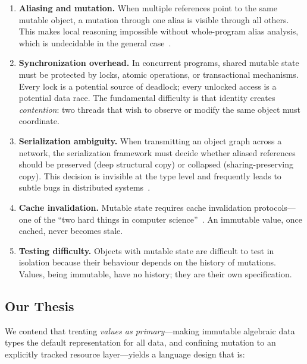 \documentclass[11pt]{article}
\theoremstyle{definition}
\theoremstyle{remark}
\begin{document}
\begin{enumerate}
  \item \textbf{Aliasing and mutation.}  When multiple references
    point to the same mutable object, a mutation through one alias is
    visible through all others.  This makes local reasoning
    impossible without whole-program alias analysis, which is
    undecidable in the general case~\cite{landi1992undecidability}.

  \item \textbf{Synchronization overhead.}  In concurrent programs,
    shared mutable state must be protected by locks, atomic
    operations, or transactional mechanisms.  Every lock is a
    potential source of deadlock; every unlocked access is a potential
    data race.  The fundamental difficulty is that identity creates
    \emph{contention}: two threads that wish to observe or modify the
    same object must coordinate.

  \item \textbf{Serialization ambiguity.}  When transmitting an
    object graph across a network, the serialization framework must
    decide whether aliased references should be preserved (deep
    structural copy) or collapsed (sharing-preserving copy).  This
    decision is invisible at the type level and frequently leads to
    subtle bugs in distributed systems~\cite{armstrong2007programming}.

  \item \textbf{Cache invalidation.}  Mutable state requires cache
    invalidation protocols---one of the ``two hard things in computer
    science''~\cite{fowler2003patterns}.  An immutable value, once
    cached, never becomes stale.

  \item \textbf{Testing difficulty.}  Objects with mutable state are
    difficult to test in isolation because their behaviour depends on
    the history of mutations.  Values, being immutable, have no
    history; they are their own specification.
\end{enumerate}

\subsection{Our Thesis}

We contend that treating \emph{values as primary}---making immutable
algebraic data types the default representation for all data, and
confining mutation to an explicitly tracked resource layer---yields a
language design that is:
\end{document}
